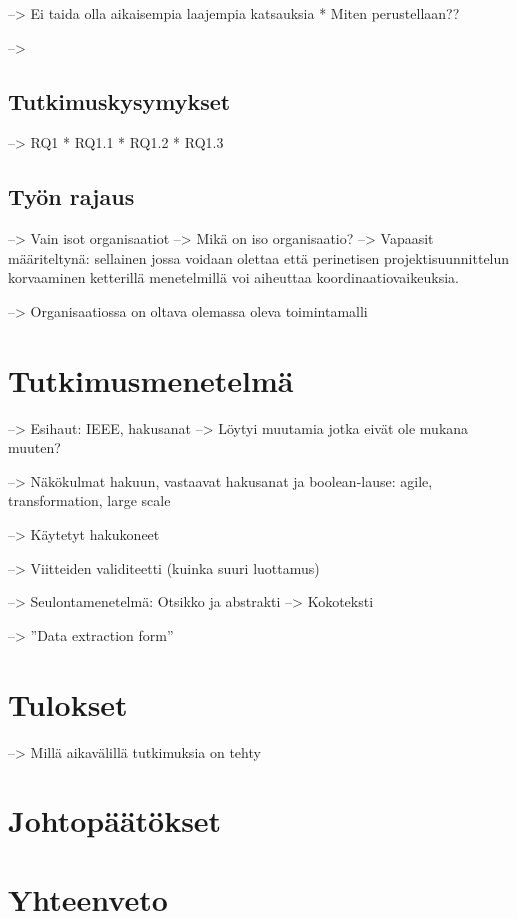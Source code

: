 --> Ei taida olla aikaisempia laajempia katsauksia
    * Miten perustellaan??
    
--> 

\subsection{Tutkimuskysymykset}

--> RQ1
 * RQ1.1
 * RQ1.2
 * RQ1.3

\subsection{Työn rajaus}

--> Vain isot organisaatiot
--> Mikä on iso organisaatio? --> Vapaasit määriteltynä: sellainen jossa voidaan
olettaa että perinetisen projektisuunnittelun korvaaminen ketterillä
menetelmillä voi aiheuttaa koordinaatiovaikeuksia.

--> Organisaatiossa on oltava olemassa oleva toimintamalli


\section{Tutkimusmenetelmä}
\label{sec:menetelma}

\citep{refworks:148}

--> Esihaut: IEEE, hakusanat --> Löytyi muutamia jotka eivät ole mukana muuten?

--> Näkökulmat hakuun, vastaavat hakusanat ja boolean-lause: agile,
transformation, large scale

--> Käytetyt hakukoneet

--> Viitteiden validiteetti (kuinka suuri luottamus)

--> Seulontamenetelmä: Otsikko ja abstrakti --> Kokoteksti

--> ''Data extraction form''


\section{Tulokset}
\label{sec:tulokset}

--> Millä aikavälillä tutkimuksia on tehty


\section{Johtopäätökset}
\label{sec:johtopaatokset}





\section{Yhteenveto}
\label{sec:yhteenveto}




